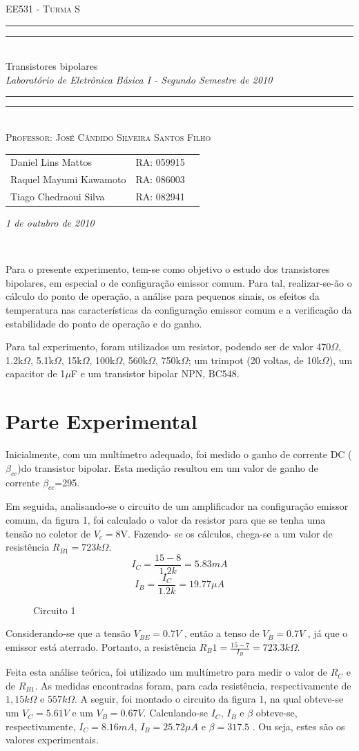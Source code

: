 \documentclass[a4paper]{article} %
\date{Outubro 1, 2010}
\newcommand*{\titleTMB}{\begingroup \centering \settowidth{\unitlength}{\LARGE EE531} {\large\scshape EE531 - Turma S}\\[0.2\baselineskip] \rule{11.0cm}{1.6pt}\vspace*{-\baselineskip}\vspace*{2pt} \rule{11.0cm}{0.4pt}\\[\baselineskip] {\LARGE Transistores bipolares}\\\vspace*{\baselineskip}  {\itshape Laboratório de Eletrônica Básica I - Segundo Semestre de 2010}\\ \rule{11.0cm}{0.4pt}\vspace*{-\baselineskip}\vspace{3.2pt} \rule{11.0cm}{1.6pt}\\[\baselineskip] {\large\scshape Professor: José Cândido Silveira Santos Filho}\par \vfill {\normalsize   \scshape 
    \begin{center} 
      \begin{tabular}{  l  l  p{5cm} } 
 	Daniel Lins Mattos & RA: 059915\\
        Raquel Mayumi Kawamoto & RA: 086003\\
        Tiago Chedraoui Silva  & RA: 082941\\
      \end{tabular} \end{center}
    \itshape 1 de outubro de 2010    }\\[\baselineskip] \vspace{3.2pt} \endgroup}
\begin{document}
\titleTMB 
\newpage

Para o presente experimento, tem-se como objetivo o estudo dos transistores bipolares, em
especial o de configuração emissor comum. Para tal, realizar-se-ão o cálculo do ponto de
operação, a análise para pequenos sinais, os efeitos da temperatura nas características da
configuração emissor comum e a verificação da estabilidade do ponto de operação e do
ganho.

Para tal experimento, foram utilizados um resistor, podendo ser de valor 470$\Omega$, 1.2k$\Omega$, 5.1k$\Omega$,
15k$\Omega$, 100k$\Omega$, 560k$\Omega$, 750k$\Omega$; um trimpot (20 voltas, de 10k$\Omega$), um capacitor de 1$\mu$F e um
transistor bipolar NPN, BC548.

\section*{Parte Experimental}

Inicialmente, com um multímetro adequado, foi medido o ganho de corrente DC
($\beta_{cc}$)do transistor bipolar. Esta medição resultou em um valor de ganho de corrente
$\beta_{cc}$=295.


Em seguida, analisando-se o circuito de um amplificador na configuração emissor
comum, da figura 1, foi calculado o valor da resistor
para que se tenha uma tensão no
coletor de $V_c=$8V. Fazendo- se os cálculos, chega-se a um valor de resistência
$R_{B1}=723k\Omega$.
\begin{displaymath}
I_C=\frac{15-8}{1.2k}=5.83mA
\end{displaymath}
\begin{displaymath}
I_B=\frac{I_C}{1.2k}=19.77\mu A
\end{displaymath}

\begin{figure}[h]
\centerline{}
\caption{Circuito 1\label{circ:1}}
\end{figure}


Considerando-se que a tensão $V_{BE}=0.7V$ 
, então a tenso de $V_{B}=0.7V$ , já que o
emissor está aterrado. Portanto, a resistência
$R_B1=\frac{15-7}{I_B}=723.3k\Omega$.


Feita esta análise teórica, foi utilizado um multímetro para medir o valor de $R_C$ e de $R_{B1}$. As medidas encontradas foram, para cada resistência, respectivamente de $1,15k\Omega$ e $557k\Omega$. A seguir, foi montado o circuito da figura 1, na qual obteve-se um $V_C=5.61V$ e um $V_B=0.67V$. Calculando-se $I_C$, $I_B$ e $\beta$ obteve-se, respectivamente,
 $I_C=8.16mA$, $I_B=25.72\mu A$ e $\beta=317.5$
. Ou seja, estes são os valores experimentais.
\end{document}

